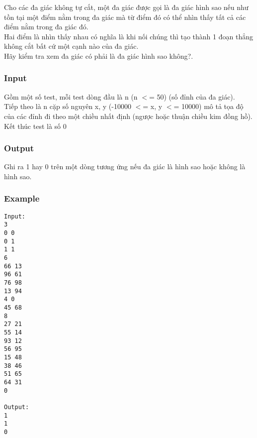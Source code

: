 



   Cho các đa giác không tự cắt, một đa giác được gọi là đa giác hình sao nếu như tồn tại một điểm nằm trong đa giác mà từ điểm đó có thể nhìn thấy tất cả các điểm nằm trong đa giác đó.   
\\   Hai điểm là nhìn thấy nhau có nghĩa là khi nối chúng thì tạo thành 1 đoạn thẳng không cắt bất cứ một cạnh nào của đa giác.   
\\   Hãy kiểm tra xem đa giác có phải là đa giác hình sao không?.  

\subsubsection{   Input  }

   Gồm một số test, mỗi test dòng đầu là n (n $<$= 50) (số đỉnh của đa giác).   
\\   Tiếp theo là n cặp số nguyên x, y (-10000 $<$= x, y $<$= 10000) mô tả tọa độ của các đỉnh đi theo một chiều nhất định (ngược hoặc thuận chiều kim đồng hồ).   
\\   Kết thúc test là số 0  

\subsubsection{   Output  }

   Ghi ra 1 hay 0 trên một dòng tương ứng nếu đa giác là hình sao hoặc không là hình sao.  

\subsubsection{   Example  }
\begin{verbatim}
Input:
3
0 0
0 1
1 1
6
66 13
96 61
76 98
13 94
4 0
45 68
8
27 21
55 14
93 12
56 95
15 48
38 46
51 65
64 31
0

Output:
1
1
0
\end{verbatim}